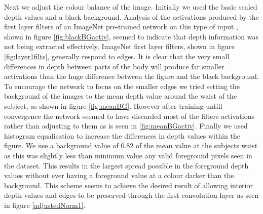 \documentclass[11pt]{article} %
\begin{document}
Next we adjust the colour balance of the image. Initially we used the basic scaled depth values and a black background. Analysis of the activations produced by the first layer filters of an ImageNet pre-trained network on this type of input , shown in figure \ref{fig:blackBGactiv}, seemed to indicate that depth information was not being extracted effectively. ImageNet first layer filters, shown in figure \ref{fig:layer1filts}, generally respond to edges. It is clear that the very small differences in depth between parts of the body will produce far smaller activations than the huge difference between the figure and the black background. To encourage the network to focus on the smaller edges we tried setting the background of the images to the mean depth value around the waist of the subject, as shown in figure \ref{fig:meanBG}. However after training untill convergence the network seemed to have discarded most of the filters activations rather than adjusting to them as is seen in \ref{fig:meanBGactiv}. Finally we used histogram equalisation to increase the differences in depth values within the figure. We use a background value of 0.82 of the mean value at the subjects waist as this was slightly less than minimum value any valid foreground pixels seen in the dataset. This results in the largest spread possible in the foreground depth values without ever having a foreground value at a colour darker than the background. This scheme seems to achieve the desired result of allowing interior depth values and edges to be preserved through the first convolution layer as seen in figure \ref{adjustedNorm1}. 
\end{document}
